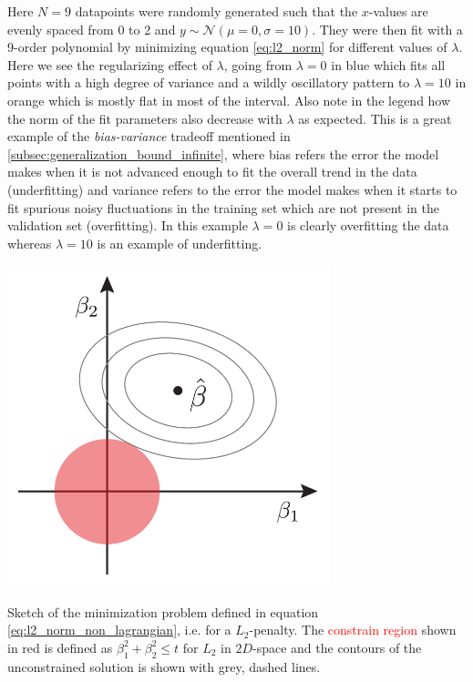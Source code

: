 Here $N=9$ datapoints were randomly generated such that the $x$-values are evenly spaced from \num{0} to \num{2} and $y \sim \mathcal{N}(\mu=0, \sigma=10)$. They were then fit with a \num{9}-order polynomial by minimizing equation \eqref{eq:l2_norm} for different values of $\lambda$. Here we see the regularizing effect of $\lambda$, going from $\lambda=0$ in blue which fits all points with a high degree of variance and a wildly oscillatory pattern to $\lambda=10$ in orange which is mostly flat in most of the interval. Also note in the legend how the norm of the fit parameters also decrease with $\lambda$ as expected. This is a great example of the \emph{bias-variance} tradeoff mentioned in \autoref{subsec:generalization_bound_infinite}, where bias refers the error the model makes when it is not advanced enough to fit the overall trend in the data (underfitting) and variance refers to the error the model makes when it starts to fit spurious noisy fluctuations in the training set which are not present in the validation set (overfitting). In this example $\lambda=0$ is clearly overfitting the data whereas $\lambda=10$ is an example of underfitting. 

\begin{marginfigure}[-0.5cm]
  \includegraphics[width=0.7\textwidth]{figures/ridge_lasso_sparse/ridge.pdf}
  \caption[Regularization Effect of $L_2$ ]
    {Sketch of the minimization problem defined in equation \eqref{eq:l2_norm_non_lagrangian}, i.e. for a $L_2$-penalty. The \textcolor{red}{constrain region} shown in red is defined as $\beta_1^2 + \beta_2^2 \leq t$ for $L_2$ in $2D$-space and the contours of the unconstrained solution is shown with grey, dashed lines. 
    }
  \label{fig:ml:regularization_effect_ridge}
\end{marginfigure}

